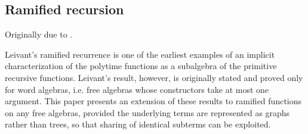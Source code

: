\subsection{Ramified recursion}

Originally due to \cite{leivant-1995}. 

Leivant’s ramified recurrence is one of the earliest examples of an implicit
characterization of the polytime functions as a subalgebra of the primitive
recursive functions. Leivant’s result, however, is originally stated and proved
only for word algebras, i.e. free algebras whose constructors take at most one
argument. This paper presents an extension of these results to ramified
functions on any free algebras, provided the underlying terms are represented
as graphs rather than trees, so that sharing of identical subterms can be
exploited. \cite{dal-lago-et-al-2010}

